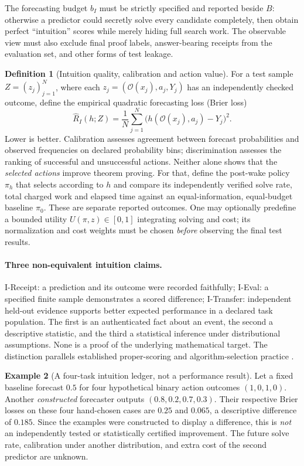 \documentclass[11pt,letterpaper]{article}
\theoremstyle{definition}
\newtheorem{definition}{Definition}[section]
\theoremstyle{plain}
\theoremstyle{definition}
\newtheorem{example}[definition]{Example}
\begin{document}
The forecasting budget $b_I$ must be strictly specified and reported beside
$B$: otherwise a predictor could secretly solve every candidate completely,
then obtain perfect ``intuition'' scores while merely hiding full search work.
The observable view must also exclude final proof labels, answer-bearing
receipts from the evaluation set, and other forms of test leakage.

\begin{definition}[Intuition quality, calibration and action value]
For a test sample $Z=(z_j)_{j=1}^{N}$, where each
$z_j=(\mathcal O(x_j),a_j,Y_j)$ has an independently checked outcome,
define the empirical quadratic forecasting loss (Brier loss)
\[
 \widehat R_I(h;Z)=\frac1N\sum_{j=1}^N
     \bigl(h(\mathcal O(x_j),a_j)-Y_j\bigr)^2.
 \tag{I.1}
\]
Lower is better. Calibration assesses agreement between forecast probabilities
and observed frequencies on declared probability bins; discrimination
assesses the ranking of successful and unsuccessful actions. Neither alone
shows that the \emph{selected actions} improve theorem proving. For that,
define the post-wake policy $\pi_h$ that selects according to $h$ and compare
its independently verified solve rate, total charged work and elapsed time
against an equal-information, equal-budget baseline $\pi_0$. These are
separate reported outcomes. One may optionally predefine a bounded utility
$U(\pi,z)\in[0,1]$ integrating solving and cost; its normalization and
cost weights must be chosen \emph{before} observing the final test results.
\end{definition}

\paragraph{Three non-equivalent intuition claims.}
\textsf{I-Receipt}: a prediction and its outcome were recorded faithfully;
\textsf{I-Eval}: a specified finite sample demonstrates a scored difference;
\textsf{I-Transfer}: independent held-out evidence supports better expected
performance in a declared task population. The first is an authenticated
fact about an event, the second a descriptive statistic, and the third a
statistical inference under distributional assumptions. None is a proof
of the underlying mathematical target. The distinction parallels
established proper-scoring and algorithm-selection practice
\cite{brier,satzilla,leandojo}.

\begin{example}[A four-task intuition ledger, not a performance result]
Let a fixed baseline forecast $0.5$ for four hypothetical binary action
outcomes $(1,0,1,0)$. Another \emph{constructed} forecaster outputs
$(0.8,0.2,0.7,0.3)$. Their respective Brier losses on these four
hand-chosen cases are $0.25$ and $0.065$, a descriptive difference of
$0.185$. Since the examples were constructed to display a difference,
this is \emph{not} an independently tested or statistically certified
improvement. The future solve rate, calibration under another distribution,
and extra cost of the second predictor are unknown.
\end{example}
\end{document}

